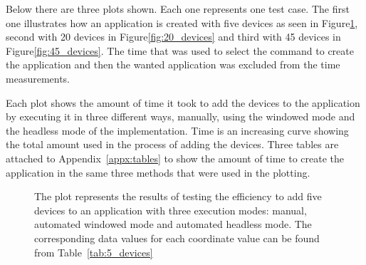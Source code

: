 Below there are three plots shown. Each one represents one test case.
The first one illustrates how an application is created with five devices as seen in Figure\ref{fig:5_devices}, second with 20 devices in Figure\ref{fig:20_devices} and third with 45 devices in Figure\ref{fig:45_devices}.
The time that was used to select the command to create the application and then the wanted application was excluded from the time measurements.

Each plot shows the amount of time it took to add the devices to the application by executing it in three different ways, manually, using the windowed mode and the headless mode of the implementation.
Time is an increasing curve showing the total amount used in the process of adding the devices.
Three tables are attached to Appendix~\ref{appx:tables} to show the amount of time to create the application in the same three methods that were used in the plotting.

\begin{figure}[H]
\centering
{}

    \caption{The plot represents the results of testing the efficiency to add five devices to an application with three execution modes: manual, automated windowed mode and automated headless mode.
    The corresponding data values for each coordinate value can be found from Table~\ref{tab:5_devices}}\label{fig:5_devices}
\end{figure}

